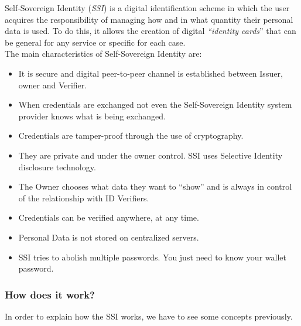 \documentclass[a4paper, 12pt]{article} %
\begin{document}
            Self-Sovereign Identity (\textit{SSI}) is a digital identification scheme in which the user acquires the responsibility of managing how and in what quantity their personal data is used. To do this, it allows the creation of digital \textit{“identity cards}” that can be general for any service or specific for each case. \\
            The main characteristics of Self-Sovereign Identity are\cite{ssi-guide}:
            \begin{itemize}
                \item It is secure and digital peer-to-peer channel is established between Issuer, owner and Verifier.
                \item When credentials are exchanged not even the Self-Sovereign Identity system provider knows what is being exchanged.
                \item Credentials are tamper-proof through the use of cryptography.
                \item They are private and under the owner control. SSI uses Selective Identity disclosure technology.
                \item The Owner chooses what data they want to “show” and is always in control of the relationship with ID Verifiers.
                \item Credentials can be verified anywhere, at any time.
                \item Personal Data is not stored on centralized servers.
                \item SSI tries to abolish multiple passwords. You just need to know your wallet password.
            \end{itemize}

            \subsubsection{How does it work?}
                In order to explain how the SSI works, we have to see some concepts previously.
\end{document}
